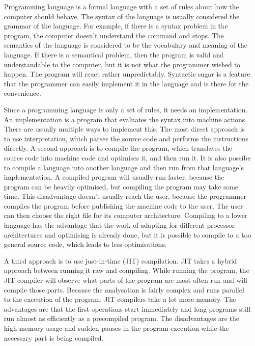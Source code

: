 Programming language is a formal language with a set of rules about how the
computer should behave. The syntax of the language is usually considered the
grammar of the language. For example, if there is a syntax problem in the
program, the computer doesn't understand the command and stops. The semantics of
the language is considered to be the vocabulary and meaning of the language. If
there is a semantical problem, then the program is valid and understandable to
the computer, but it is not what the programmer wished to happen. The program
will react rather unpredictably. Syntactic sugar is a feature that the
programmer can easily implement it in the language and is there for the
convenience.\cite{website:syntax-semantics}

Since a programming language is only a set of rules, it needs an implementation.
An implementation is a program that evaluates the syntax into machine actions.
There are usually multiple ways to implement this. The most direct approach is
to use interpretation, which parses the source code and performs the
instructions directly. A second approach is to compile the program, which
translates the source code into machine code and optimises it, and then run it.
It is also possibe to compile a language into another language and then run from
that language's implementation. A compiled program will usually run faster,
because the program can be heavily optimised, but compiling the program may take
some time. This disadvantage doesn't usually reach the user, because the
programmer compiles the program before  publishing the machine code to the user.
The user can then choose the right file for its computer architecture. Compiling
to a lower language has the advantage that the work of adapting for different
processor architectures and optimising is already done, but it is possible to
compile to a too general source code, which leads to less optimisations.

A third approach is to use just-in-time (JIT) compilation. JIT takes a hybrid
approach between running it raw and compiling. While running the program, the
JIT compiler will observe what parts of the program are most often run and will
compile those parts. Because the analysation is fairly complex and runs parallel
to the execution of the program, JIT compilers take a lot more
memory.\cite{website:jit-memory} The advantages are that the first operations start
immediately and long programs still run almost as efficiently as a precompiled program. The disadvantages are the high memory usage and sudden pauses in the program execution while the necessary part is being compiled.

